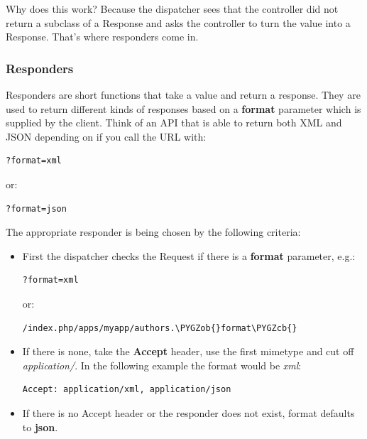 \documentclass[letterpaper,10pt,english]{sphinxmanual}
\def\PYGZob{\char`\{}
\def\PYGZcb{\char`\}}
\begin{document}
Why does this work? Because the dispatcher sees that the controller did not return a subclass of a Response and asks the controller to turn the value into a Response. That's where responders come in.


\subsubsection{Responders}
\label{app/controllers:responders}
Responders are short functions that take a value and return a response. They are used to return different kinds of responses based on a \textbf{format} parameter which is supplied by the client. Think of an API that is able to return both XML and JSON depending on if you call the URL with:

\begin{Verbatim}[commandchars=\\\{\}]
?format=xml
\end{Verbatim}

or:

\begin{Verbatim}[commandchars=\\\{\}]
?format=json
\end{Verbatim}

The appropriate responder is being chosen by the following criteria:
\begin{itemize}
\item {} 
First the dispatcher checks the Request if there is a \textbf{format} parameter, e.g.:

\begin{Verbatim}[commandchars=\\\{\}]
?format=xml
\end{Verbatim}

or:

\begin{Verbatim}[commandchars=\\\{\}]
/index.php/apps/myapp/authors.\PYGZob{}format\PYGZcb{}
\end{Verbatim}

\item {} 
If there is none, take the \textbf{Accept} header, use the first mimetype and cut off \emph{application/}. In the following example the format would be \emph{xml}:

\begin{Verbatim}[commandchars=\\\{\}]
Accept: application/xml, application/json
\end{Verbatim}

\item {} 
If there is no Accept header or the responder does not exist, format defaults to \textbf{json}.

\end{itemize}
\end{document}
